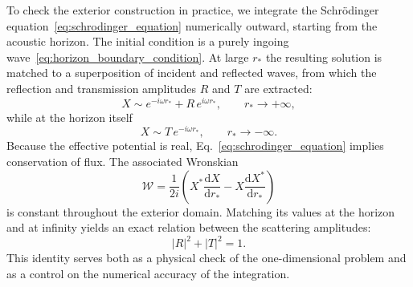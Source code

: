 \documentclass[12pt,a4paper,preprint,nopreprintline]{elsarticle}
\begin{document}
To check the exterior construction in practice, we integrate the Schr\"odinger equation~\eqref{eq:schrodinger_equation} numerically outward, starting from the acoustic horizon. The initial condition is a purely ingoing wave~\eqref{eq:horizon_boundary_condition}. At large $r_{*}$ the resulting solution is matched to a superposition of incident and reflected waves, from which the reflection and transmission amplitudes $R$ and $T$ are extracted:
\begin{equation}
    X
    \sim
    e^{-i\omega r_{*}}
    +R\,e^{i\omega r_{*}},
    \qquad
    r_{*}\rightarrow+\infty,
    \label{eq:scattering_amplitudes}
\end{equation}
while at the horizon itself
\begin{equation}
    X
    \sim
    T\,e^{-i\omega r_{*}},
    \qquad
    r_{*}\rightarrow-\infty.
    \label{eq:scattering_horizon_amplitude}
\end{equation}
Because the effective potential is real, Eq.~\eqref{eq:schrodinger_equation} implies conservation of flux. The associated Wronskian
\begin{equation}
    \mathcal{W}
    =
    \frac{1}{2i}
    \left(
        X^{*}\frac{\mathrm{d}X}{\mathrm{d}r_{*}}
        -
        X\frac{\mathrm{d}X^{*}}{\mathrm{d}r_{*}}
    \right)
    \label{eq:wronskian_flux}
\end{equation}
is constant throughout the exterior domain. Matching its values at the horizon and at infinity yields an exact relation between the scattering amplitudes:
\begin{equation}
    |R|^{2}+|T|^{2}=1.
    \label{eq:flux_conservation}
\end{equation}
This identity serves both as a physical check of the one-dimensional problem and as a control on the numerical accuracy of the integration.
\end{document}
